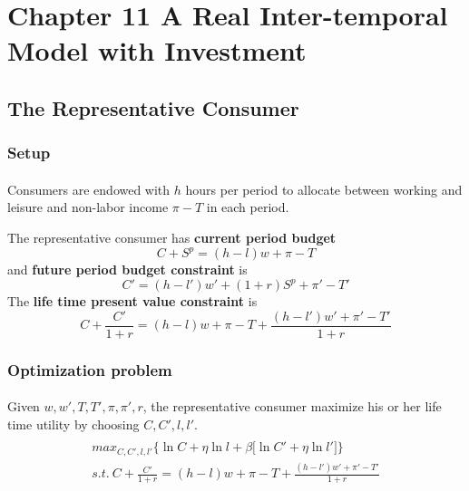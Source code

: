 \documentclass[11pt]{article}
\begin{document}
		
	\section{Chapter 11 A Real Inter-temporal Model with Investment}	
		\subsection{The Representative Consumer}
			\subsubsection{Setup}
			\paragraph{} Consumers are endowed with $h$ hours per period to allocate between working and leisure and non-labor income $\pi - T$ in each period.
			\par The representative consumer has \textbf{current period budget}
			\begin{equation}
				C + S^p = (h - l)w + \pi - T
			\end{equation}
			and \textbf{future period budget constraint} is
			\begin{equation}
				C' = (h - l')w' + (1+r)S^p + \pi' - T'
			\end{equation}
			The \textbf{life time present value constraint} is 
			\begin{equation}
				C + \frac{C'}{1+r} = (h - l)w + \pi - T + \frac{(h - l')w' + \pi' - T'}{1+r}
			\end{equation}
			
			\subsubsection{Optimization problem}
			\paragraph{} Given $w, w', T, T', \pi, \pi', r$, the representative consumer maximize his or her life time utility by choosing $C,C',l,l'$.
			\begin{multline}
				\\
				max_{C,C',l,l'} \big \{ \ln{C} + \eta \ln{l} + \beta \big [ \ln{C'} + \eta \ln{l'} \big] \big \} \\
				s.t.\ C + \frac{C'}{1+r} = (h - l)w + \pi - T + \frac{(h - l')w' + \pi' - T'}{1+r}
				\\
			\end{multline}
\end{document}
